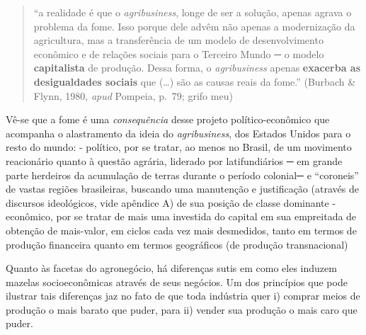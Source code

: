 \documentclass[12pt]{article}
\numberwithin{equation}{section}
\theoremstyle{plain}
\theoremstyle{definition}
\theoremstyle{remark}
\begin{document}
\begin{quote}
``a realidade é que o \textit{agribusiness}, longe de ser a solução, apenas agrava o problema da fome. Isso porque dele advêm não apenas a modernização da agricultura, mas a transferência de um modelo de desenvolvimento econômico e de relações sociais para o Terceiro Mundo ─ o modelo \textbf{capitalista} de produção. Dessa forma, o \textit{agribusiness} apenas \textbf{exacerba as desigualdades sociais} que (\ldots) são as causas reais da fome.'' (Burbach \& Flynn, 1980, \textit{apud} Pompeia, p.~79; grifo meu)
\end{quote}

Vê-se que a fome é uma \textit{consequência} desse projeto político-econômico que acompanha o alastramento da ideia do \textit{agribusiness}, dos Estados Unidos para o resto do mundo: - político, por se tratar, ao menos no Brasil, de um movimento reacionário quanto à questão agrária, liderado por latifundiários ─ em grande parte herdeiros da acumulação de terras durante o período colonial─ e ``coroneis'' de vastas regiões brasileiras, buscando uma manutenção e justificação (através de discursos ideológicos, vide apêndice A) de sua posição de classe dominante - econômico, por se tratar de mais uma investida do capital em sua empreitada de obtenção de mais-valor, em ciclos cada vez mais desmedidos, tanto em termos de produção financeira quanto em termos geográficos (de produção transnacional)

Quanto às facetas do agronegócio, há diferenças sutis em como eles induzem mazelas socioeconômicas através de seus negócios. Um dos princípios que pode ilustrar tais diferenças jaz no fato de que toda indústria quer i) comprar meios de produção o mais barato que puder, para ii) vender sua produção o mais caro que puder.
\end{document}
